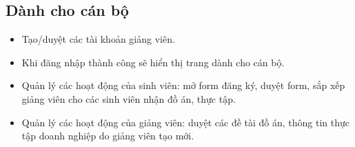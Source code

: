 \subsection{Dành cho cán bộ}
\begin{itemize}
	\item Tạo/duyệt các tài khoản giảng viên.
	\item Khi đăng nhập thành công sẽ hiển thị trang dành cho cán bộ.
	\item Quản lý các hoạt động của sinh viên: mở form đăng ký, duyệt form, sắp xếp giảng viên cho các sinh viên nhận đồ án, thực tập.
	\item Quản lý các hoạt động của giảng viên: duyệt các đề tài đồ án, thông tin thực tập doanh nghiệp do giảng viên tạo mới.
\end{itemize}